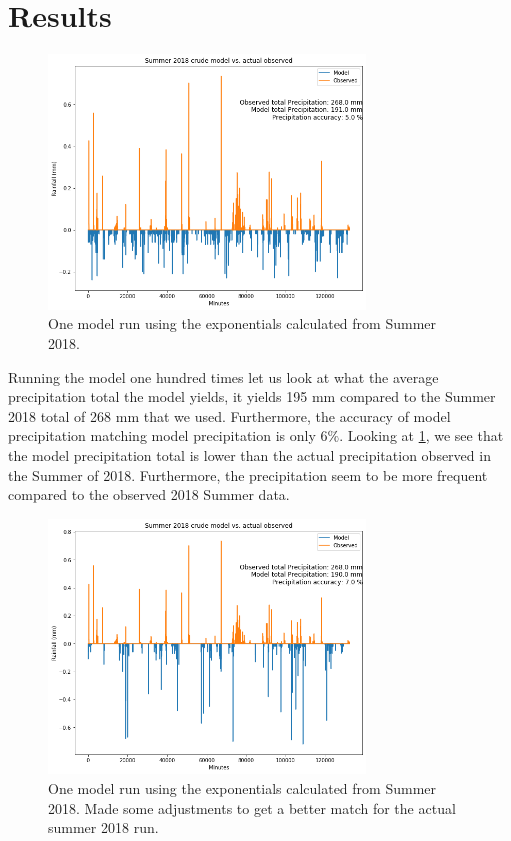\documentclass[11pt]{report}
\begin{document}
\clearpage
\section{Results\label{sec:results}}
\begin{figure}[t]
	\centering
	\includegraphics[width=0.75\textwidth]{Figures/better_one_run.png}
	\caption[One run using Summer 2018 climatology]
	{\label{crudemodel}One model run using the exponentials calculated from Summer 2018.  }
\end{figure}
Running the model one hundred times let us look at what the average precipitation total the model yields, it yields 195 mm compared to the Summer 2018 total of 268 mm that we used. Furthermore, the accuracy of model precipitation matching model precipitation is only 6$\%$. Looking at \ref{crudemodel}, we see that the model precipitation total is lower than the actual precipitation observed in the Summer of 2018. Furthermore, the precipitation seem to be more frequent compared to the observed 2018 Summer data. 

\clearpage
\begin{figure}[t]
	\centering
	\includegraphics[width=0.75\textwidth]{Figures/best_one_run.png}
	\caption[Modified run using Summer 2018 climatology]
	{\label{crudermodel} One model run using the exponentials calculated from Summer 2018. Made some adjustments to get a better match for the actual summer 2018 run.}
\end{figure}
\end{document}
